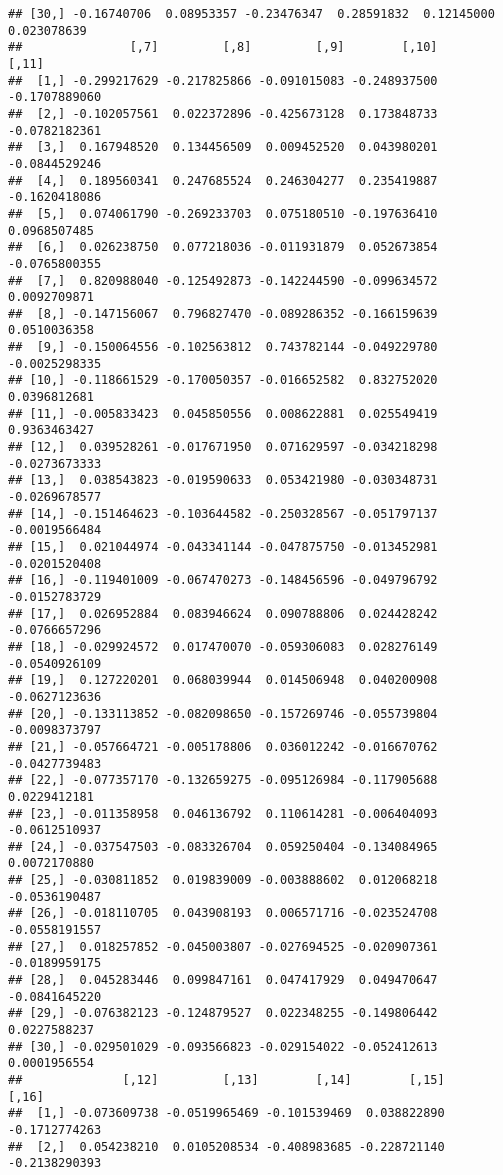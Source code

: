 \documentclass[
]{book}
\begin{document}
\begin{verbatim}
## [30,] -0.16740706  0.08953357 -0.23476347  0.28591832  0.12145000  0.023078639
##               [,7]         [,8]         [,9]        [,10]         [,11]
##  [1,] -0.299217629 -0.217825866 -0.091015083 -0.248937500 -0.1707889060
##  [2,] -0.102057561  0.022372896 -0.425673128  0.173848733 -0.0782182361
##  [3,]  0.167948520  0.134456509  0.009452520  0.043980201 -0.0844529246
##  [4,]  0.189560341  0.247685524  0.246304277  0.235419887 -0.1620418086
##  [5,]  0.074061790 -0.269233703  0.075180510 -0.197636410  0.0968507485
##  [6,]  0.026238750  0.077218036 -0.011931879  0.052673854 -0.0765800355
##  [7,]  0.820988040 -0.125492873 -0.142244590 -0.099634572  0.0092709871
##  [8,] -0.147156067  0.796827470 -0.089286352 -0.166159639  0.0510036358
##  [9,] -0.150064556 -0.102563812  0.743782144 -0.049229780 -0.0025298335
## [10,] -0.118661529 -0.170050357 -0.016652582  0.832752020  0.0396812681
## [11,] -0.005833423  0.045850556  0.008622881  0.025549419  0.9363463427
## [12,]  0.039528261 -0.017671950  0.071629597 -0.034218298 -0.0273673333
## [13,]  0.038543823 -0.019590633  0.053421980 -0.030348731 -0.0269678577
## [14,] -0.151464623 -0.103644582 -0.250328567 -0.051797137 -0.0019566484
## [15,]  0.021044974 -0.043341144 -0.047875750 -0.013452981 -0.0201520408
## [16,] -0.119401009 -0.067470273 -0.148456596 -0.049796792 -0.0152783729
## [17,]  0.026952884  0.083946624  0.090788806  0.024428242 -0.0766657296
## [18,] -0.029924572  0.017470070 -0.059306083  0.028276149 -0.0540926109
## [19,]  0.127220201  0.068039944  0.014506948  0.040200908 -0.0627123636
## [20,] -0.133113852 -0.082098650 -0.157269746 -0.055739804 -0.0098373797
## [21,] -0.057664721 -0.005178806  0.036012242 -0.016670762 -0.0427739483
## [22,] -0.077357170 -0.132659275 -0.095126984 -0.117905688  0.0229412181
## [23,] -0.011358958  0.046136792  0.110614281 -0.006404093 -0.0612510937
## [24,] -0.037547503 -0.083326704  0.059250404 -0.134084965  0.0072170880
## [25,] -0.030811852  0.019839009 -0.003888602  0.012068218 -0.0536190487
## [26,] -0.018110705  0.043908193  0.006571716 -0.023524708 -0.0558191557
## [27,]  0.018257852 -0.045003807 -0.027694525 -0.020907361 -0.0189959175
## [28,]  0.045283446  0.099847161  0.047417929  0.049470647 -0.0841645220
## [29,] -0.076382123 -0.124879527  0.022348255 -0.149806442  0.0227588237
## [30,] -0.029501029 -0.093566823 -0.029154022 -0.052412613  0.0001956554
##              [,12]         [,13]        [,14]        [,15]         [,16]
##  [1,] -0.073609738 -0.0519965469 -0.101539469  0.038822890 -0.1712774263
##  [2,]  0.054238210  0.0105208534 -0.408983685 -0.228721140 -0.2138290393

\end{verbatim}
\end{document}
